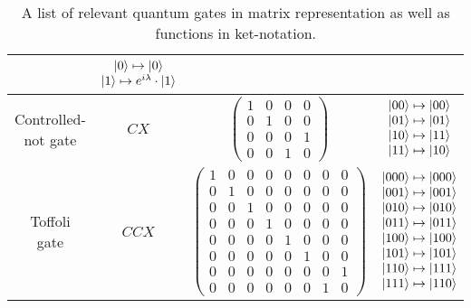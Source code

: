 \begin{table}[htp]
\begin{tabular}{c|c|cc}
                                    & $\begin{matrix} \ket{0} \mapsto \ket{0} \\ \ket{1} \mapsto e^{i\lambda} \cdot \ket{1} \end{matrix}$             \\ \hline
    Controlled-not gate          & $CX$     
                                    & $\begin{pmatrix} 1 & 0 & 0 & 0\\ 0 & 1 & 0 & 0\\ 0 & 0 & 0 & 1\\ 0 & 0 & 1 & 0 \end{pmatrix}$       
                                    & $\begin{matrix} \ket{00} \mapsto \ket{00} \\ \ket{01} \mapsto \ket{01} \\ \ket{10} \mapsto \ket{11} \\ \ket{11} \mapsto \ket{10} \end{matrix}$\\ \hline
    Toffoli  gate                & $CCX$     
                                    & $\begin{pmatrix} 1 & 0 & 0 & 0 & 0 & 0 & 0 & 0 \\ 0 & 1 & 0 & 0 & 0 & 0 & 0 & 0 \\ 0 & 0 & 1 & 0 & 0 & 0 & 0 & 0 \\ 0 & 0 & 0 & 1 & 0 & 0 & 0 & 0 \\ 0 & 0 & 0 & 0 & 1 & 0 & 0 & 0 \\ 0 & 0 & 0 & 0 & 0 & 1 & 0 & 0 \\ 0 & 0 & 0 & 0 & 0 & 0 & 0 & 1 \\ 0 & 0 & 0 & 0 & 0 & 0 & 1 & 0 \end{pmatrix}$       
                                    & $\begin{matrix} \ket{000} \mapsto \ket{000} \\ \ket{001} \mapsto \ket{001} \\ \ket{010} \mapsto \ket{010} \\ \ket{011} \mapsto \ket{011} \\  \ket{100} \mapsto \ket{100} \\ \ket{101} \mapsto \ket{101} \\ \ket{110} \mapsto \ket{111} \\ \ket{111} \mapsto \ket{110} \end{matrix}$            
    \end{tabular}
    \caption{A list of relevant quantum gates in matrix representation as well as functions in ket-notation.}
    \label{tab:gates}
\end{table}

